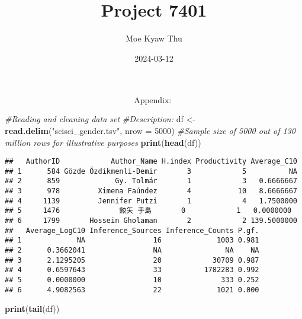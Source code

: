 \documentclass[
]{article}
\title{Project 7401}
\author{Moe Kyaw Thu}
\date{2024-03-12}
\newenvironment{Shaded}{\begin{snugshade}}{\end{snugshade}}
\newcommand{\AttributeTok}[1]{\textcolor[rgb]{0.13,0.29,0.53}{#1}}
\newcommand{\CommentTok}[1]{\textcolor[rgb]{0.56,0.35,0.01}{\textit{#1}}}
\newcommand{\DecValTok}[1]{\textcolor[rgb]{0.00,0.00,0.81}{#1}}
\newcommand{\FunctionTok}[1]{\textcolor[rgb]{0.13,0.29,0.53}{\textbf{#1}}}
\newcommand{\NormalTok}[1]{#1}
\newcommand{\OtherTok}[1]{\textcolor[rgb]{0.56,0.35,0.01}{#1}}
\newcommand{\StringTok}[1]{\textcolor[rgb]{0.31,0.60,0.02}{#1}}
\begin{document}
\maketitle

\[
\text{Appendix: }
\]

\begin{Shaded}
\begin{Highlighting}[]
\CommentTok{\#Reading and cleaning data set}
\CommentTok{\#Description: }
\NormalTok{df }\OtherTok{\textless{}{-}} \FunctionTok{read.delim}\NormalTok{(}\StringTok{"scisci\_gender.tsv"}\NormalTok{, }\AttributeTok{nrow =} \DecValTok{5000}\NormalTok{) }\CommentTok{\#Sample size of 5000 out of 130 million rows for illustrative purposes}
\FunctionTok{print}\NormalTok{(}\FunctionTok{head}\NormalTok{(df))}
\end{Highlighting}
\end{Shaded}

\begin{verbatim}
##   AuthorID            Author_Name H.index Productivity Average_C10
## 1      584 Gözde Özdikmenli-Demir       3            5          NA
## 2      859             Gy. Tolmár       1            3   0.6666667
## 3      978         Ximena Faúndez       4           10   8.6666667
## 4     1139         Jennifer Putzi       1            4   1.7500000
## 5     1476              勲矢 手島       0            1   0.0000000
## 6     1799       Hossein Gholaman       2            2 139.5000000
##   Average_LogC10 Inference_Sources Inference_Counts P.gf.
## 1             NA                16             1003 0.981
## 2      0.3662041                NA               NA    NA
## 3      2.1295205                20            30709 0.987
## 4      0.6597643                33          1782283 0.992
## 5      0.0000000                10              333 0.252
## 6      4.9082563                22             1021 0.000
\end{verbatim}

\begin{Shaded}
\begin{Highlighting}[]
\FunctionTok{print}\NormalTok{(}\FunctionTok{tail}\NormalTok{(df))}
\end{Highlighting}
\end{Shaded}
\end{document}
